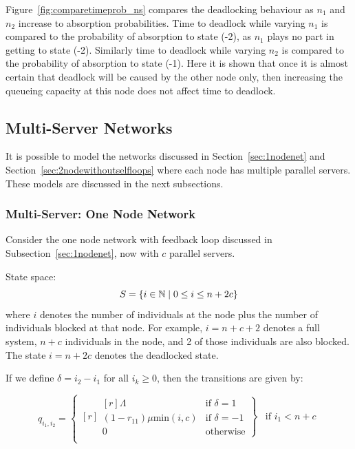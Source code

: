 \documentclass{article}
\begin{document}
Figure~\ref{fig:comparetimeprob_ns} compares the deadlocking behaviour as $n_1$ and $n_2$ increase to absorption probabilities.
Time to deadlock while varying $n_1$ is compared to the probability of absorption to state (-2), as $n_1$ plays no part in getting to state (-2).
Similarly time to deadlock while varying $n_2$ is compared to the probability of absorption to state (-1).
Here it is shown that once it is almost certain that deadlock will be caused by the other node only, then increasing the queueing capacity at this node does not affect time to deadlock.


\subsection{Multi-Server Networks}
It is possible to model the networks discussed in Section~\ref{sec:1nodenet} and Section~\ref{sec:2nodewithoutselfloops} where each node has multiple parallel servers.
These models are discussed in the next subsections.

\subsubsection{Multi-Server: One Node Network}
Consider the one node network with feedback loop discussed in Subsection~\ref{sec:1nodenet}, now with $c$ parallel servers.

State space:
        \[S = \{i\in\mathbb{N} \nonscript\; | \nonscript\; 0 \leq i \leq n + 2c\}\]
where \(i\) denotes the number of individuals at the node plus the number of individuals blocked at that node.
For example, $i=n+c+2$ denotes a full system, $n+c$ individuals in the node, and 2 of those individuals are also blocked.
The state $i=n+2c$ denotes the deadlocked state.

If we define $\delta = i_2 - i_1$ for all $i_k \geq 0$, then the transitions are given by:

\begin{equation}
  q_{i_1, i_2} = \left\{
  \begin{matrix*}[ r ]
    \left. \begin{matrix*}[ r ]
      \Lambda & \text{if } \delta = 1 \\
      (1-r_{11})\mu\text{min}(i, c) & \text{if } \delta = -1 \\
      0 & \text{otherwise}
    \end{matrix*} \right\} & \text{if } i_1 < n + c \\
  \end{matrix*} \right.
\end{equation}
\end{document}
